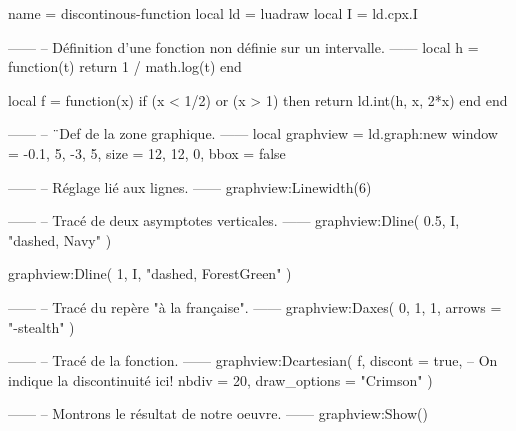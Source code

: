 \documentclass[border = 3pt]{standalone}
\begin{document}
\begin{luadraw*}{name = discontinous-function}
local ld = luadraw
local I  = ld.cpx.I

------
-- Définition d'une fonction non définie sur un intervalle.
------
local h = function(t)
  return 1 / math.log(t)
end

local f = function(x)
  if (x < 1/2) or (x > 1) then
    return ld.int(h, x, 2*x)
  end
end

------
-- ¨Def de la zone graphique.
------
local graphview = ld.graph:new{
  window = {-0.1, 5, -3, 5},
  size   = {12, 12, 0},
  bbox   = false
}

------
-- Réglage lié aux lignes.
------
graphview:Linewidth(6)

------
-- Tracé de deux asymptotes verticales.
------
graphview:Dline(
  {0.5, I},
  "dashed, Navy"
)

graphview:Dline(
  {1, I},
  "dashed, ForestGreen"
)

------
-- Tracé du repère "à la française".
------
graphview:Daxes(
  {0, 1, 1},
  {arrows = "-stealth"}
)

------
-- Tracé de la fonction.
------
graphview:Dcartesian(
  f,
  {
    discont      = true, -- On indique la discontinuité ici!
    nbdiv        = 20,
    draw_options = "Crimson"
  }
)

------
-- Montrons le résultat de notre oeuvre.
------
graphview:Show()
\end{luadraw*}
\end{document}
